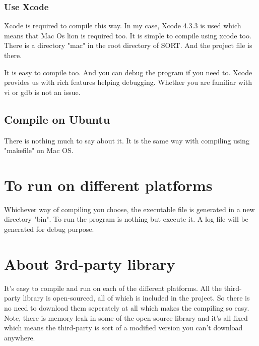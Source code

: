 \documentclass[10pt,a4paper]{article}
\begin{document}
\subsubsection{ Use Xcode }
Xcode is required to compile this way.
In my case, Xcode 4.3.3 is used which means that Mac Os lion is required too.
It is simple to compile using xcode too.
There is a directory "mac" in the root directory of SORT.
And the project file is there.

It is easy to compile too.
And you can debug the program if you need to.
Xcode provides us with rich features helping debugging.
Whether you are familiar with vi or gdb is not an issue.

\subsection{ Compile on Ubuntu }
There is nothing much to say about it.
It is the same way with compiling using "makefile" on Mac OS.

\section{ To run on different platforms }
Whichever way of compiling you choose, the executable file is generated in a new directory "bin".
To run the program is nothing but execute it.
A log file will be generated for debug purpose.

\section{ About 3rd-party library }
It's easy to compile and run on each of the different platforms.
All the third-party library is open-sourced, all of which is included in the project.
So there is no need to download them seperately at all which makes the compiling so easy.
Note, there is memory leak in some of the open-source library and it's all fixed which means the third-party is sort of a modified version you can't download anywhere.
\end{document}
